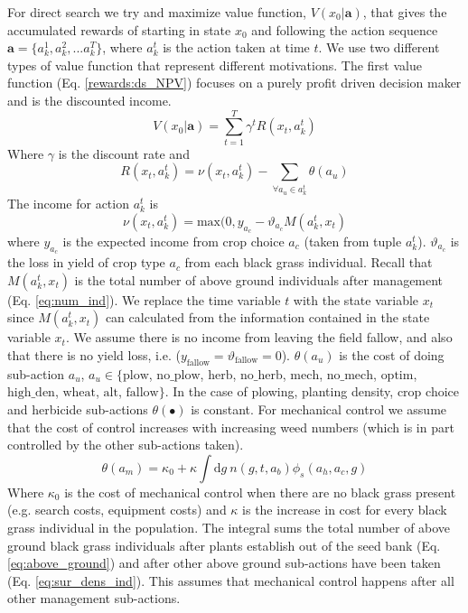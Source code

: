 \documentclass[12pt, a4paper]{article}
\begin{document}
For direct search we try and maximize value function, $V(x_0|\mathbf{a})$, that gives the accumulated rewards of starting in state $x_0$ and following the action sequence $\mathbf{a} = \{a_k^1, a_k^2, ... a_k^T\}$, where $a_k^t$ is the action taken at time $t$. We use two different types of value function that represent different motivations. The first value function (Eq. \ref{rewards:ds_NPV}) focuses on a purely profit driven decision maker and is the discounted income. 
\begin{equation}\label{rewards:ds_NPV}
	V(x_0|\mathbf{a}) = \sum_{t = 1}^{T} \gamma^t R(x_t, a_k^t) 
\end{equation}
Where $\gamma$ is the discount rate and 
\begin{equation}\label{rewards:immediate}
	R(x_t, a_k^t) = \nu(x_t, a_k^t) - \sum_{\forall a_u \in a_k^t} \theta(a_u)  
\end{equation}
The income for action $a_k^t$ is 
\begin{equation}
	\nu(x_t, a_k^t) = \text{max}(0, y_{a_c} - \vartheta_{a_c} M(a_k^t, x_t)
\end{equation}
where $y_{a_c}$ is the expected income from crop choice $a_c$ (taken from tuple $a_k^t$). $\vartheta_{a_c}$ is the loss in yield of crop type $a_c$ from each black grass individual. Recall that $M(a_k^t, x_t)$ is the total number of above ground individuals after management (Eq. \ref{eq:num_ind}). We replace the time variable $t$ with the state variable $x_t$ since $M(a_k^t, x_t)$ can calculated from the information contained in the state variable $x_t$. We assume there is no income from leaving the field fallow, and also that there is no yield loss, i.e. ($y_\text{fallow} = \vartheta_\text{fallow} = 0$). $\theta(a_u)$ is the cost of doing sub-action $a_u$, $a_u \in \{\text{plow}$, $\text{no\_plow}$, $\text{herb}$, $\text{no\_herb}$, $\text{mech}$, $\text{no\_mech}$, $\text{optim}$, $\text{high\_den}$, $\text{wheat}$, $\text{alt}$, $\text{fallow}\}$. In the case of plowing, planting density, crop choice and herbicide sub-actions $\theta(\bullet)$ is constant. For mechanical control we assume that the cost of control increases with increasing weed numbers (which is in part controlled by the other sub-actions taken).
\begin{equation}\label{eq:cost_mech}
	\theta(a_m) = \kappa_0 + \kappa \int \text{d}g~ n(g, t, a_b)\phi_s(a_h, a_c, g)
\end{equation}    
Where $\kappa_0$ is the cost of mechanical control when there are no black grass present (e.g. search costs, equipment costs) and $\kappa$ is the increase in cost for every black grass individual in the population. The integral sums the total number of above ground black grass individuals after plants establish out of the seed bank (Eq. \ref{eq:above_ground}) and after other above ground sub-actions have been taken (Eq. \ref{eq:sur_dens_ind}). This assumes that mechanical control happens after all other management sub-actions. 
\end{document}
